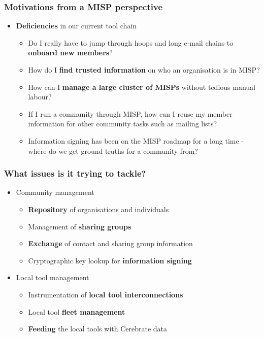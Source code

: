 \begin{frame}
    \frametitle{Motivations from a MISP perspective}
    \begin{itemize}
        \item {\bf Deficiencies} in our current tool chain
        \begin{itemize}
            \item Do I really have to jump through hoops and long e-mail chains to {\bf onboard new members}?
            \item How do I {\bf find trusted information} on who an organisation is in MISP?
            \item How can I {\bf manage a large cluster of MISPs} without tedious manual labour?
            \item If I run a community through MISP, how can I reuse my member information for other community tasks such as mailing lists?
            \item Information signing has been on the MISP roadmap for a long time - where do we get ground truths for a community from?
        \end{itemize}
    \end{itemize}
\end{frame}

\begin{frame}
    \frametitle{What issues is it trying to tackle?}
    \begin{itemize}
        \item Community management
        \begin{itemize}
            \item {\bf Repository} of organisations and individuals
            \item Management of {\bf sharing groups}
            \item {\bf Exchange} of contact and sharing group information
            \item Cryptographic key lookup for {\bf information signing}
        \end{itemize}
        \item Local tool management
        \begin{itemize}
            \item Instrumentation of {\bf local tool interconnections}
            \item Local tool {\bf fleet management}
            \item {\bf Feeding} the local tools with Cerebrate data
        \end{itemize}
    \end{itemize}
\end{frame}

